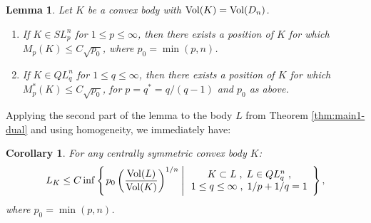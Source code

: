 \documentclass[12pt,oneside]{amsart}
\newtheorem{cor}[thm]{Corollary}
\newtheorem{lem}[thm]{Lemma}
\theoremstyle{definition}
\theoremstyle{remark}
\theoremstyle{proof}
\numberwithin{equation}{section}
\newcommand{\set}[1]{\left\{#1\right\}}
\newcommand{\brac}[1]{\left(#1\right)}
\newcommand{\Vol}[1]{\textnormal{Vol} (#1)}
\newcommand{\VolRatio}[2]{\brac{\frac{\Vol{#1}}{\Vol{#2}}}^{1/n}}
\begin{document}


\begin{lem} \label{lem:M_p-bound}
Let $K$ be a convex body with $\Vol{K} = \Vol{D_n}$.
\begin{enumerate}
\item
If $K \in SL_p^n$ for $1\leq p \leq \infty$, then there exists a
position of $K$ for which $M_p(K) \leq C \sqrt{p_0}$, where $p_0 =
\min(p,n)$.
\item
If $K \in QL_q^n$ for $1 \leq q \leq \infty$, then there exists a
position of $K$ for which $M^*_p(K) \leq C \sqrt{p_0}$, for $p =
q^* = q/(q-1)$ and $p_0$ as above.
\end{enumerate}
\end{lem}

Applying the second part of the lemma to the body $L$ from
Theorem \ref{thm:main1-dual} and using homogeneity, we immediately
have:

\begin{cor} \label{cor:main1-dual}
For any centrally symmetric convex body $K$:
\[
L_K \leq C \inf \set{\left . p_0 \VolRatio{L}{K} \: \right |
\begin{array}{c} K \subset L \; , \; L \in QL_q^n \; , \\ 1 \leq q \leq
\infty \; , \; 1/p + 1/q = 1 \end{array} },
\]
where $p_0 = \min(p,n)$.
\end{cor}
\end{document}
